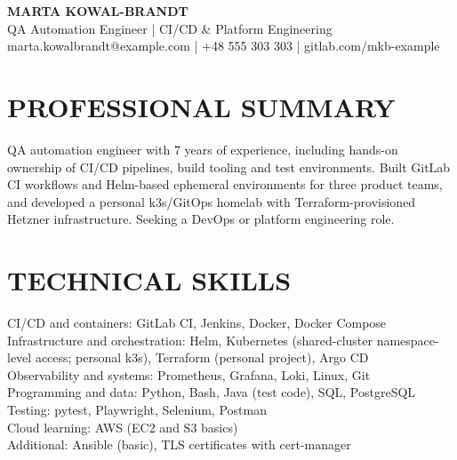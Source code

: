 \documentclass[11pt,a4paper]{article}
\begin{document}
\begin{center}
{\LARGE\bfseries\color{primarycolor} MARTA KOWAL-BRANDT}\\[0.25em]
{\large QA Automation Engineer | CI/CD \& Platform Engineering}\\[0.25em]
{\small marta.kowalbrandt@example.com | +48 555 303 303 | gitlab.com/mkb-example}
\end{center}

\section*{PROFESSIONAL SUMMARY}
QA automation engineer with 7 years of experience, including hands-on ownership of CI/CD pipelines, build tooling and test environments. Built GitLab CI workflows and Helm-based ephemeral environments for three product teams, and developed a personal k3s/GitOps homelab with Terraform-provisioned Hetzner infrastructure. Seeking a DevOps or platform engineering role.

\section*{TECHNICAL SKILLS}
CI/CD and containers: GitLab CI, Jenkins, Docker, Docker Compose\\
Infrastructure and orchestration: Helm, Kubernetes (shared-cluster namespace-level access; personal k3s), Terraform (personal project), Argo CD\\
Observability and systems: Prometheus, Grafana, Loki, Linux, Git\\
Programming and data: Python, Bash, Java (test code), SQL, PostgreSQL\\
Testing: pytest, Playwright, Selenium, Postman\\
Cloud learning: AWS (EC2 and S3 basics)\\
Additional: Ansible (basic), TLS certificates with cert-manager
\end{document}
